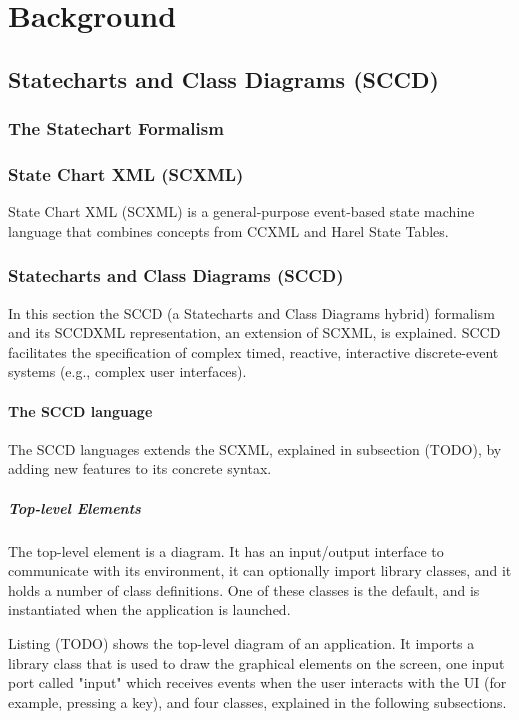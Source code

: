 \chapter{Background}
\label{chapt:Background}

\section{Statecharts and Class Diagrams (SCCD)}
\subsection{The Statechart Formalism}

\subsection{State Chart XML (SCXML)}
State Chart XML (SCXML) is a general-purpose event-based state machine language that combines concepts from CCXML and Harel 
State Tables. 




\subsection{Statecharts and Class Diagrams (SCCD)}
In this section the SCCD (a Statecharts and Class Diagrams hybrid) formalism and its SCCDXML representation, an extension 
of SCXML, is explained. SCCD facilitates the specification of complex timed, reactive, interactive discrete-event systems 
(e.g., complex user interfaces).

\subsubsection{The SCCD language}
The SCCD languages extends the SCXML, explained in subsection (TODO), by adding new features to its concrete syntax.

\paragraph{Top-level Elements}
The top-level element is a diagram. It has an input/output interface to communicate with its environment, it can optionally 
import library classes, and it holds a number of class definitions. One of these classes is the default, and is instantiated 
when the application is launched.


Listing (TODO) shows the top-level diagram of an application. It imports a library class that is used to draw the graphical 
elements on the screen, one input port called "input" which receives events when the user interacts with the UI (for example, 
pressing a key), and four classes, explained in the following subsections.

